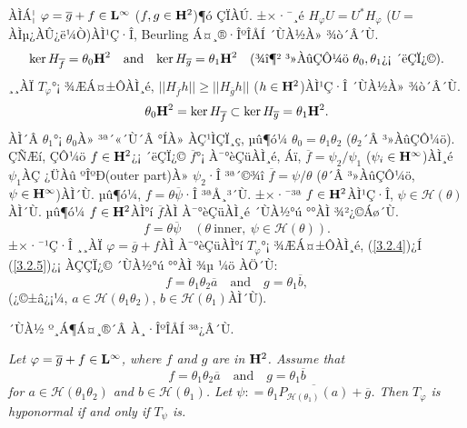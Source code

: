 \documentclass[12pt,a4paper,2sided]{article}
\newcommand{\vs}{\vspace}
\begin{document}
\vspace{0.8cm}

ÀÌÁ¦ $\varphi = \overline{g}+ f \in \bold L^{\infty}$ ($f,g\in\bold
H^2$)¶ó ÇÏÀÚ. ±×·¯¸é $H_\varphi U=U^*H_\varphi$
($U=$ÀÌµ¿ÀÛ¿ë¼Ò)ÀÌ¹Ç·Î, Beurling Á¤¸®·ÎºÎÅÍ ´ÙÀ½À» ¾ò´Â´Ù.
$$
\text{ker}\, H_{\overline f}=\theta_0 \bold H^2\quad\text{and}\quad \text{ker}\,H_{\overline g}
=\theta_1 \bold H^2\quad\text{(¾î¶² ³»ÀûÇÔ¼ö $\theta_0, \theta_1$¿¡ ´ëÇÏ¿©)}.
$$
¸¸ÀÏ $T_\varphi$°¡ ¾ÆÁ¤±ÔÀÌ¸é, $||H_{\overline f} h||\ge ||H_{\overline g} h||$
($h\in \bold H^2$)ÀÌ¹Ç·Î ´ÙÀ½À» ¾ò´Â´Ù.
\begin{equation}\label{3.2.4}
\theta_0 \bold H^2=\text{ker}\, H_{\overline f}\subset \text{ker}\, H_{\overline g}=\theta_1 \bold H^2.
\end{equation}
ÀÌ´Â $\theta_1$°¡ $\theta_0$À» ³ª´«´Ù´Â °ÍÀ» ÀÇ¹ÌÇÏ¸ç, µû¶ó¼­
$\theta_0=\theta_1\theta_2$ ($\theta_2$´Â ³»ÀûÇÔ¼ö). ÇÑÆí, ÇÔ¼ö
$f\in \bold H^2$¿¡ ´ëÇÏ¿© $\overline{f}$°¡ À¯°èÇüÀÌ¸é, Áï,
$\overline{f}=\psi_2/\psi_1$ ($\psi_i\in \bold H^\infty$)ÀÌ¸é
$\psi_1$ÀÇ ¿ÜÀû ºÎºÐ(outer part)À»  $\psi_2$·Î ³ª´©¾î
$\overline{f}=\psi/\theta$ ($\theta$´Â ³»ÀûÇÔ¼ö, $\psi\in \bold
H^\infty$)ÀÌ´Ù. µû¶ó¼­, $f=\theta\overline{\psi}$·Î ³ªÅ¸³­´Ù. ±×·¯³ª
$f\in \bold H^2$ÀÌ¹Ç·Î, $\psi\in\mathcal{H}(\theta)$ÀÌ´Ù. µû¶ó¼­
$f\in \bold H^2$ÀÌ°í $\overline{f}$ÀÌ À¯°èÇüÀÌ¸é ´ÙÀ½°ú °°ÀÌ
¾²¿©Áø´Ù.
\begin{equation}\label{3.2.5}
f=\theta\overline{\psi}\quad (\theta\ \text{inner},\ \psi\in \mathcal{H}(\theta)).
\end{equation}
±×·¯¹Ç·Î ¸¸ÀÏ $\varphi=\overline g+f$ÀÌ À¯°èÇüÀÌ°í $T_\varphi$°¡
¾ÆÁ¤±ÔÀÌ¸é, (\ref{3.2.4})¿Í (\ref{3.2.5})¿¡ ÀÇÇÏ¿© ´ÙÀ½°ú °°ÀÌ ¾µ ¼ö
ÀÖ´Ù:
$$
f=\theta_1\theta_2\overline{a}\quad\text{and}\quad g=\theta_1\overline b,
$$
(¿©±â¿¡¼­, $a\in \mathcal{H}(\theta_1\theta_2)$,
$b\in\mathcal{H}(\theta_1)$ÀÌ´Ù).


´ÙÀ½ º¸Á¶Á¤¸®´Â \cite{CuL1}À¸·ÎºÎÅÍ ³ª¿Â´Ù.

\vs{0.2cm}{\bf Lemma 3.3.1.} {\sl Let $\varphi = \overline{g}+ f \in
\bold L^{\infty}$, where $f$ and $g$ are in $\bold H^2$. Assume that
\begin{equation}\label{3.2.6}
f= \theta_1 \theta_2 \overline{a}\quad\text{and}\quad g = \theta_1
\overline{b}
\end{equation}
for $a \in \mathcal H (\theta_1 \theta_2)$ and $b \in \mathcal H
(\theta_1)$. Let $\psi: = \theta_1 \overline{P_{ \mathcal H
(\theta_1)}(a)} + \overline{g}$. Then $T_{\varphi}$ is hyponormal
if and only if $T_{\psi}$ is.}
\end{document}
